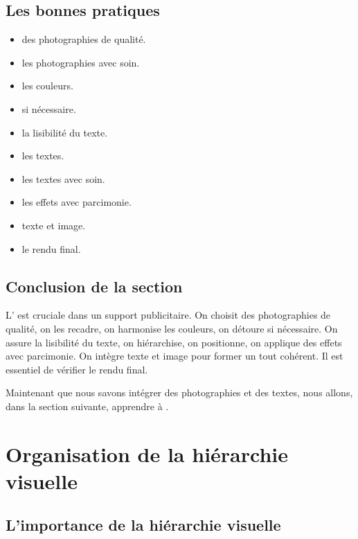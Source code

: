 \subsection{Les bonnes pratiques}

\begin{itemize}
    \item {} des photographies de qualité.
    \item {} les photographies avec soin.
    \item {} les couleurs.
    \item {} si nécessaire.
    \item {} la lisibilité du texte.
    \item {} les textes.
    \item {} les textes avec soin.
    \item {} les effets avec parcimonie.
    \item {} texte et image.
    \item {} le rendu final.
\end{itemize}

\subsection*{Conclusion de la section}

L' est cruciale dans un support publicitaire. On choisit des photographies de qualité, on les recadre, on harmonise les couleurs, on détoure si nécessaire. On assure la lisibilité du texte, on hiérarchise, on positionne, on applique des effets avec parcimonie. On intègre texte et image pour former un tout cohérent. Il est essentiel de vérifier le rendu final.

Maintenant que nous savons intégrer des photographies et des textes, nous allons, dans la section suivante, apprendre à .

\section{Organisation de la hiérarchie visuelle}

\subsection{L'importance de la hiérarchie visuelle}

